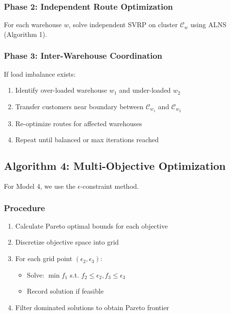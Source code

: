 \subsubsection{Phase 2: Independent Route Optimization}

For each warehouse $w$, solve independent SVRP on cluster $\mathcal{C}_w$ using ALNS (Algorithm 1).

\subsubsection{Phase 3: Inter-Warehouse Coordination}

If load imbalance exists:
\begin{enumerate}
\item Identify over-loaded warehouse $w_1$ and under-loaded $w_2$
\item Transfer customers near boundary between $\mathcal{C}_{w_1}$ and $\mathcal{C}_{w_2}$
\item Re-optimize routes for affected warehouses
\item Repeat until balanced or max iterations reached
\end{enumerate}

\subsection{Algorithm 4: Multi-Objective Optimization}

For Model 4, we use the $\epsilon$-constraint method.

\subsubsection{Procedure}

\begin{enumerate}
\item Calculate Pareto optimal bounds for each objective
\item Discretize objective space into grid
\item For each grid point $(\epsilon_2, \epsilon_3)$:
\begin{itemize}
\item Solve: $\min f_1$ s.t. $f_2 \leq \epsilon_2, f_3 \leq \epsilon_3$
\item Record solution if feasible
\end{itemize}
\item Filter dominated solutions to obtain Pareto frontier
\end{enumerate}

